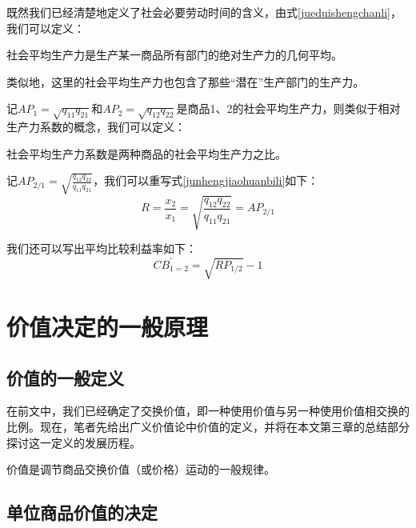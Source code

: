 既然我们已经清楚地定义了社会必要劳动时间的含义，由式\ref{jueduishengchanli}，我们可以定义：
\begin{definition}
    社会平均生产力是生产某一商品所有部门的绝对生产力的几何平均。
\end{definition}

类似地，这里的社会平均生产力也包含了那些“潜在”生产部门的生产力。

记$\mathit{AP}_1 = \sqrt{q_{11}q_{21}}$和$\mathit{AP}_2 = \sqrt{q_{12}q_{22}}$是商品1、2的社会平均生产力，则类似于相对生产力系数的概念，我们可以定义：
\begin{definition}
    社会平均生产力系数是两种商品的社会平均生产力之比\cite[68]{CaiJiMingCongXiaYiJieZhiLunDaoGuangYiJieZhiLunXiuDingBan2022}。
\end{definition}

记$\mathit{AP}_{2/1} = \sqrt{\frac{q_{12}q_{22}}{q_{11}q_{21}}}$，我们可以重写式\ref{junhengjiaohuanbili}如下\cite[68]{CaiJiMingCongXiaYiJieZhiLunDaoGuangYiJieZhiLunXiuDingBan2022}：
\begin{equation}
    \mathit{R} = \frac{x_2}{x_1} = \sqrt{\frac{q_{12}q_{22}}{q_{11}q_{21}}} = \mathit{AP}_{2/1}
\end{equation}

我们还可以写出平均比较利益率如下：
\begin{equation}
    \mathit{CB}^{\prime}_{1=2} = \sqrt{\mathit{RP}_{1/2}} - 1
\end{equation}

\section{价值决定的一般原理}

\subsection{价值的一般定义}

在前文中，我们已经确定了交换价值，即一种使用价值与另一种使用价值相交换的比例。现在，笔者先给出广义价值论中价值的定义，并将在本文第三章的总结部分探讨这一定义的发展历程。

\begin{definition}
    价值是调节商品交换价值（或价格）运动的一般规律\cite[6]{CaiJiMingCongXiaYiJieZhiLunDaoGuangYiJieZhiLunXiuDingBan2022}。
\end{definition}

\subsection{单位商品价值的决定}


